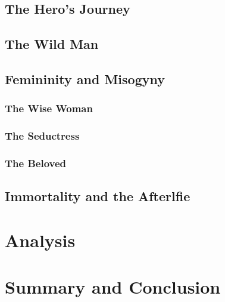 \documentclass[10pt,a4paper]{article}
\begin{document}
\subsection{The Hero's Journey}
%
%

\subsection{The Wild Man}
%
%

\subsection{Femininity and Misogyny}
\subsubsection{The Wise Woman}
%
%

\subsubsection{The Seductress}
%
%

\subsubsection{The Beloved}
%
%

\subsection{Immortality and the Afterlfie}
%
%

\section{Analysis}
%
%
%

\section{Summary and Conclusion}
%
%
\end{document}
